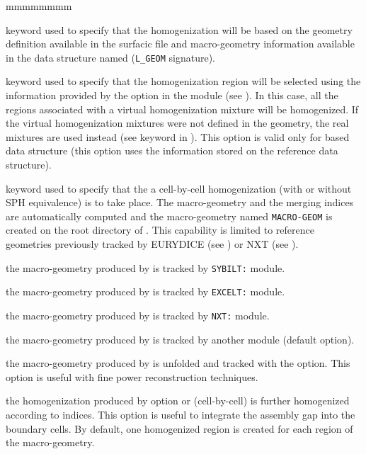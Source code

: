 \begin{ListeDeDescription}{mmmmmmmm}
\item[\moc{G2S}] keyword used to specify that the homogenization will be based on the geometry definition available in the surfacic
file  and macro-geometry information available in the data structure named  ({\tt L\_GEOM} signature).

\item[\moc{HMIX}] keyword used to specify that the homogenization region will be selected using the information provided by the  option in the  module (see ). In this case, all the regions associated with a virtual homogenization mixture will be homogenized. If the virtual homogenization mixtures were not defined in the geometry, the real mixtures are used instead (see  keyword in ). This option is valid only for  based  data structure (this option uses the information stored on the reference  data structure).

\item[\moc{CELL}] keyword used to specify that the a cell-by-cell homogenization
(with or without SPH equivalence) is to take place. The macro-geometry and the merging indices are automatically
computed and the macro-geometry named {\tt MACRO-GEOM} is created on the root directory of . This
capability is limited to reference geometries previously tracked by EURYDICE (see ) or NXT (see 
).

\item[\moc{SYBIL}] the macro-geometry produced by  is tracked by {\tt SYBILT:} module.

\item[\moc{EXCELL}] the macro-geometry produced by  is tracked by {\tt EXCELT:} module.

\item[\moc{NXT}] the macro-geometry produced by  is tracked by {\tt NXT:} module.

\item[\moc{DEFAULT}] the macro-geometry produced by  is tracked by another module (default option).

\item[\moc{UNFOLD}] the macro-geometry produced by  is unfolded and tracked with the  option. This option is
useful with fine power reconstruction techniques.

\item[\moc{REMIX}] the homogenization produced by option   or   (cell-by-cell) is further
homogenized according to  indices. This option is useful to integrate the assembly gap into the boundary cells. By default, one homogenized region is created
for each region of the macro-geometry.


\end{ListeDeDescription}
